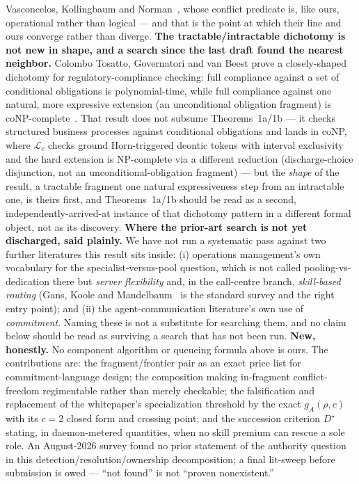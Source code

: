 \documentclass[11pt,a4paper]{article}
\begin{document}
Vasconcelos, Kollingbaum and Norman~\cite{vkn09}, whose conflict predicate is, like ours, operational rather than logical --- and
that is the point at which their line and ours converge rather than diverge. \textbf{The tractable/intractable dichotomy is not
new in shape, and a search since the last draft found the nearest neighbor.} Colombo Tosatto, Governatori and van Beest prove a
closely-shaped dichotomy for regulatory-compliance checking: full compliance against a set of conditional obligations is
polynomial-time, while full compliance against one natural, more expressive extension (an unconditional obligation fragment) is
coNP-complete~\cite{ctgvb2020,ctgvb2021}. That result does not subsume Theorems~1a/1b --- it checks structured business processes
against conditional obligations and lands in coNP, where $\mathcal{L}_c$ checks ground Horn-triggered deontic tokens with
interval exclusivity and the hard extension is NP-complete via a different reduction (discharge-choice disjunction, not an
unconditional-obligation fragment) --- but the \emph{shape} of the result, a tractable fragment one natural expressiveness step
from an intractable one, is theirs first, and Theorems~1a/1b should be read as a second, independently-arrived-at instance of
that dichotomy pattern in a different formal object, not as its discovery. \textbf{Where the prior-art search is not yet
discharged, said plainly.} We have not run a systematic pass against two further literatures this result sits inside: (i) operations management's own vocabulary for the
specialist-versus-pool question, which is not called pooling-vs-dedication there but \emph{server flexibility} and, in the
call-centre branch, \emph{skill-based routing} (Gans, Koole and Mandelbaum~\cite{gkm03} is the standard survey and the right
entry point); and (ii) the agent-communication literature's own use of \emph{commitment}. Naming these is not a substitute for
searching them, and no claim below should be read as surviving a search that has not been run. \textbf{New, honestly.} No component algorithm or queueing formula above is ours. The
contributions are: the fragment/frontier pair as an exact price list for commitment-language design; the composition making
in-fragment conflict-freedom regimentable rather than merely checkable; the falsification and replacement of the whitepaper's
specialization threshold by the exact $g_A(\rho,c)$ with its $c{=}2$ closed form and crossing point; and the succession criterion
$D^\star$ stating, in daemon-metered quantities, when no skill premium can rescue a sole role. An August-2026 survey found no
prior statement of the authority question in this detection/resolution/ownership decomposition; a final lit-sweep before
submission is owed --- ``not found'' is not ``proven nonexistent.''
\end{document}
